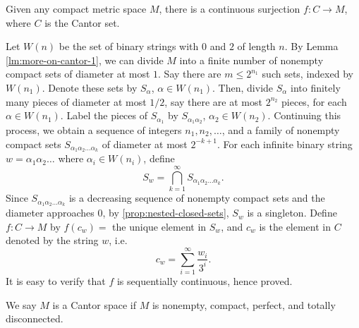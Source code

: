 \begin{thm}
    Given any compact metric space $M$, there is a continuous surjection $f: C \to M$, where $C$ is the Cantor set.
    \begin{pf}
        Let $W(n)$ be the set of binary strings with $0$ and $2$ of length $n$. By Lemma \ref{lm:more-on-cantor-1}, we can divide $M$ into a finite number of nonempty compact sets of diameter at most $1$. Say there are $m \leq 2^{n_1}$ such sets, indexed by $W(n_1)$. Denote these sets by $S_\alpha$, $\alpha \in W(n_1)$. Then, divide $S_\alpha$ into finitely many pieces of diameter at most $1/2$, say there are at most $2^{n_2}$ pieces, for each $\alpha \in W(n_1)$. Label the pieces of $S_{\alpha_1}$ by $S_{\alpha_1\alpha_2}$, $\alpha_2 \in W(n_2)$. Continuing this process, we obtain a sequence of integers $n_1, n_2, \ldots$, and a family of nonempty compact sets $S_{\alpha_1\alpha_2\ldots\alpha_k}$ of diameter at most $2^{-k+1}$. For each infinite binary string $w = \alpha_1\alpha_2\ldots$ where $\alpha_i \in W(n_i)$, define
        \[
        S_w = \bigcap_{k=1}^\infty S_{\alpha_1\alpha_2\ldots\alpha_k}.
        \]
        Since $S_{\alpha_1\alpha_2\ldots\alpha_k}$ is a decreasing sequence of nonempty compact sets and the diameter approaches $0$, by \ref{prop:nested-closed-sets}, $S_w$ is a singleton. Define $f: C \to M$ by $f(c_w) = $ the unique element in $S_w$, and $c_w$ is the element in $C$ denoted by the string $w$, i.e.
        \[
        c_w = \sum_{i=1}^\infty \frac{w_i}{3^i}.
        \]
        It is easy to verify that $f$ is sequentially continuous, hence proved.
    \end{pf}
\end{thm}

\begin{df}
    We say $M$ is a Cantor space if $M$ is nonempty, compact, perfect, and totally disconnected.
\end{df}

